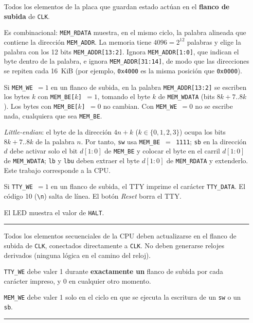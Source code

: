 \documentclass[11pt,a4paper]{article}
\newcommand{\sig}[1]{\texttt{#1}}
\newcommand{\req}[1]{\textbf{[#1]}}
\newenvironment{obligatorio}{\begin{center}\begin{minipage}{0.95\linewidth}\hrule\smallskip}{\smallskip\hrule\end{minipage}\end{center}}
\begin{document}
Todos los elementos de la placa que guardan estado actúan en el \textbf{flanco de subida} de \sig{CLK}.

\begin{description}[leftmargin=0.5cm]
\item[Lectura de memoria.] Es combinacional: \sig{MEM\_RDATA} muestra, en el mismo ciclo, la palabra alineada que contiene la dirección \sig{MEM\_ADDR}. La memoria tiene $4096 = 2^{12}$ palabras y elige la palabra con los 12 bits \sig{MEM\_ADDR[13:2]}. Ignora \sig{MEM\_ADDR[1:0]}, que indican el byte dentro de la palabra, e ignora \sig{MEM\_ADDR[31:14]}, de modo que las direcciones se repiten cada 16~KiB (por ejemplo, \sig{0x4000} es la misma posición que \sig{0x0000}).
\item[Escritura en memoria.] Si \sig{MEM\_WE}~$=1$ en un flanco de subida, en la palabra \sig{MEM\_ADDR[13:2]} se escriben los bytes $k$ con \sig{MEM\_BE[$k$]}~$=1$, tomando el byte $k$ de \sig{MEM\_WDATA} (bits $8k+7..8k$). Los bytes con \sig{MEM\_BE[$k$]}~$=0$ no cambian. Con \sig{MEM\_WE}~$=0$ no se escribe nada, cualquiera que sea \sig{MEM\_BE}.
\item[Orden de los bytes.] \emph{Little-endian}: el byte de la dirección $4n+k$ ($k\in\{0,1,2,3\}$) ocupa los bits $8k+7..8k$ de la palabra $n$. Por tanto, \sig{sw} usa \sig{MEM\_BE}~$=$~\sig{1111}; \sig{sb} en la dirección $d$ debe activar solo el bit $d[1{:}0]$ de \sig{MEM\_BE} y colocar el byte en el carril $d[1{:}0]$ de \sig{MEM\_WDATA}; \sig{lb} y \sig{lbu} deben extraer el byte $d[1{:}0]$ de \sig{MEM\_RDATA} y extenderlo. Este trabajo corresponde a la CPU.
\item[TTY.] Si \sig{TTY\_WE}~$=1$ en un flanco de subida, el TTY imprime el carácter \sig{TTY\_DATA}. El código 10 (\verb|\n|) salta de línea. El botón \emph{Reset} borra el TTY.
\item[Halt.] El LED muestra el valor de \sig{HALT}.
\end{description}

\begin{obligatorio}
\begin{description}[leftmargin=1.2cm,style=nextline]
\item[\req{R3}] Todos los elementos secuenciales de la CPU deben actualizarse en el flanco de subida de \sig{CLK}, conectados directamente a \sig{CLK}. No deben generarse relojes derivados (ninguna lógica en el camino del reloj).
\item[\req{R4}] \sig{TTY\_WE} debe valer 1 durante \textbf{exactamente un} flanco de subida por cada carácter impreso, y 0 en cualquier otro momento.
\item[\req{R5}] \sig{MEM\_WE} debe valer 1 solo en el ciclo en que se ejecuta la escritura de un \sig{sw} o un \sig{sb}.
\end{description}
\end{obligatorio}
\end{document}
